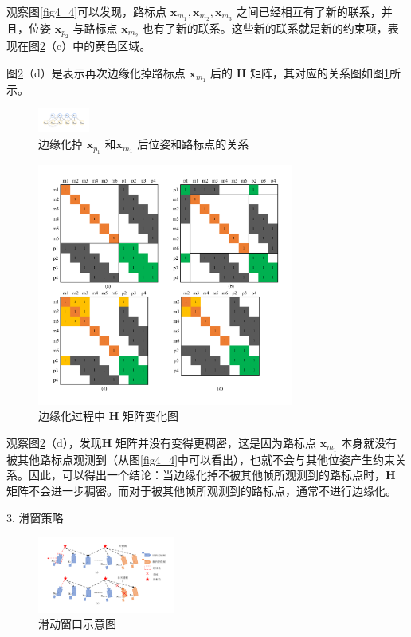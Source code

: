 观察图\ref{fig4_4}可以发现，路标点 $\mathbf{x}_{m_1},  \mathbf{x}_{m_2}, \mathbf{x}_{m_3} $ 之间已经相互有了新的联系，并且，位姿 $\mathbf{x}_{p_2} $ 与路标点 $\mathbf{x}_{m_2} $ 也有了新的联系。这些新的联系就是新的约束项，表现在图\ref{fig4_3}（c）中的黄色区域。

图\ref{fig4_3}（d）是表示再次边缘化掉路标点 $\mathbf{x}_{m_1} $ 后的 $\mathbf{H} $ 矩阵，其对应的关系图如图\ref{fig4_5}所示。
\begin{figure}[h]\setlength{\belowcaptionskip}{1pt}
	\centering
	\includegraphics[width=0.15\textwidth, angle=-90]{figures/chapter4/fig4_5}
	\caption{边缘化掉 $\mathbf{x}_{p_1} $ 和$\mathbf{x}_{m_1} $ 后位姿和路标点的关系}\label{fig4_5}
\end{figure} 
\begin{figure}[h]\setlength{\belowcaptionskip}{-12pt}
	\centering
	\includegraphics[width=0.75\textwidth, angle=-90]{figures/chapter4/fig4_3}
	\caption{边缘化过程中 $\mathbf{H} $ 矩阵变化图}\label{fig4_3}
\end{figure}
观察图\ref{fig4_3}（d），发现$\mathbf{H} $ 矩阵并没有变得更稠密，这是因为路标点 $\mathbf{x}_{m_1} $ 本身就没有被其他路标点观测到（从图\ref{fig4_4}中可以看出），也就不会与其他位姿产生约束关系。因此，可以得出一个结论：当边缘化掉不被其他帧所观测到的路标点时，$\mathbf{H} $ 矩阵不会进一步稠密。而对于被其他帧所观测到的路标点，通常不进行边缘化。

3. 滑窗策略
\begin{figure}[h]\setlength{\belowcaptionskip}{-12pt}
	\centering
	\includegraphics[width=0.4\textwidth, angle=-90]{figures/chapter4/fig4_6}
	\caption{滑动窗口示意图}\label{fig4_6}
\end{figure}


